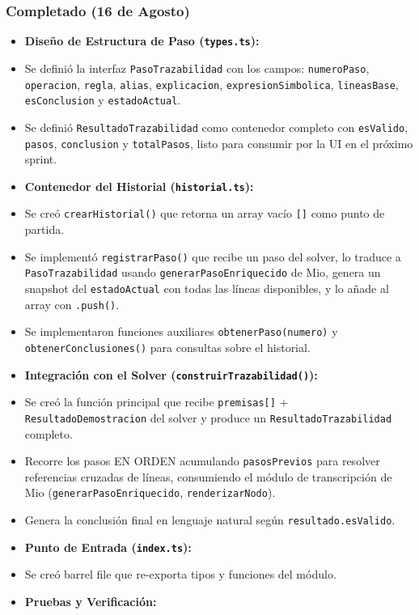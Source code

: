 \documentclass[11pt,a4paper,openany]{book}
\begin{document}
\subsubsection{Completado (16 de Agosto)}
\begin{itemize}[leftmargin=*]
\item \textbf{Diseño de Estructura de Paso (\texttt{types.ts}):}
\item Se definió la interfaz \texttt{PasoTrazabilidad} con los campos: \texttt{numeroPaso}, \texttt{operacion}, \texttt{regla}, \texttt{alias}, \texttt{explicacion}, \texttt{expresionSimbolica}, \texttt{lineasBase}, \texttt{esConclusion} y \texttt{estadoActual}.
\item Se definió \texttt{ResultadoTrazabilidad} como contenedor completo con \texttt{esValido}, \texttt{pasos}, \texttt{conclusion} y \texttt{totalPasos}, listo para consumir por la UI en el próximo sprint.
\item \textbf{Contenedor del Historial (\texttt{historial.ts}):}
\item Se creó \texttt{crearHistorial()} que retorna un array vacío \texttt{[]} como punto de partida.
\item Se implementó \texttt{registrarPaso()} que recibe un paso del solver, lo traduce a \texttt{PasoTrazabilidad} usando \texttt{generarPasoEnriquecido} de Mio, genera un snapshot del \texttt{estadoActual} con todas las líneas disponibles, y lo añade al array con \texttt{.push()}.
\item Se implementaron funciones auxiliares \texttt{obtenerPaso(numero)} y \texttt{obtenerConclusiones()} para consultas sobre el historial.
\item \textbf{Integración con el Solver (\texttt{construirTrazabilidad()}):}
\item Se creó la función principal que recibe \texttt{premisas[]} + \texttt{ResultadoDemostracion} del solver y produce un \texttt{ResultadoTrazabilidad} completo.
\item Recorre los pasos EN ORDEN acumulando \texttt{pasosPrevios} para resolver referencias cruzadas de líneas, consumiendo el módulo de transcripción de Mio (\texttt{generarPasoEnriquecido}, \texttt{renderizarNodo}).
\item Genera la conclusión final en lenguaje natural según \texttt{resultado.esValido}.
\item \textbf{Punto de Entrada (\texttt{index.ts}):}
\item Se creó barrel file que re-exporta tipos y funciones del módulo.
\item \textbf{Pruebas y Verificación:}

\end{itemize}
\end{document}
